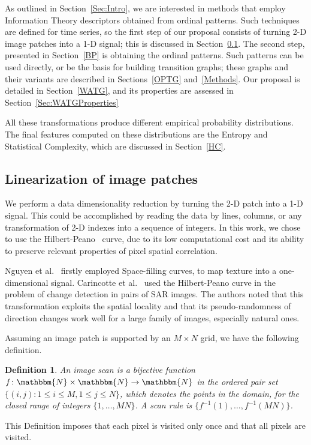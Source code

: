 \documentclass[journal]{IEEEtran}
\begin{document}
	As outlined in Section~\ref{Sec:Intro}, we are interested in methods that employ Information Theory descriptors obtained from ordinal patterns.
	Such techniques are defined for time series, so the first step of our proposal consists of turning \mbox{2-D} image patches into a \mbox{1-D} signal; this is discussed in Section~\ref{linearization}.
	The second step, presented in Section~\ref{BP} is obtaining the ordinal patterns.
	Such patterns can be used directly, or be the basis for building transition graphs; these graphs and their variants are described in Sections~\ref{OPTG} and~\ref{Methods}.
	Our proposal is detailed in Section~\ref{WATG}, and its properties are assessed in Section~\ref{Sec:WATGProperties}
	
	All these transformations produce different empirical probability distributions.
	The final features computed on these distributions are the Entropy and Statistical Complexity, which are discussed in Section~\ref{HC}.
	
	
	\subsection{Linearization of image patches}\label{linearization}
	
	We perform a data dimensionality reduction by turning the \mbox{2-D} patch into a \mbox{1-D} signal.
	This could be accomplished by reading the data by lines, columns, or any transformation of \mbox{2-D} indexes into a sequence of integers.
	In this work, we chose to use the Hilbert-Peano~\cite{Lee1994Texture} curve, due to its low computational cost and its ability to preserve relevant properties of pixel spatial correlation.
	
	Nguyen et al.~\cite{nguyen1982space} firstly employed Space-filling curves, to map texture into a one-dimensional signal.
	Carincotte et al.~\cite{Carincotte2006changeDetection} used the Hilbert-Peano curve in the problem of change detection in pairs of SAR images.
	The authors noted that this transformation exploits the spatial locality and that its pseudo-randomness
	of direction changes work well for a large family of images, especially
	natural ones.
	
	Assuming an image patch is supported by an $M \times N$ grid, we have the following definition.
	
	\newtheorem{mydef}{Definition}
	\begin{mydef}
		An image scan is a bijective function $f \colon \mathbbm{N} \times \mathbbm{N} \to \mathbbm{N}$ in the ordered pair set $ \{(i, j): 1 \leq i \leq M , 1 \leq j \leq N\}$, which denotes the points in the domain, for the closed range of integers $\{1, \dots, M  N\}$.
		A scan rule is $\{f^{-1}(1), \dots, f^{-1}(M  N)\}$.
		\label{def:CurveFilling}
	\end{mydef}
	This Definition imposes that each pixel is visited only once and that all pixels are visited.
	
\end{document}
